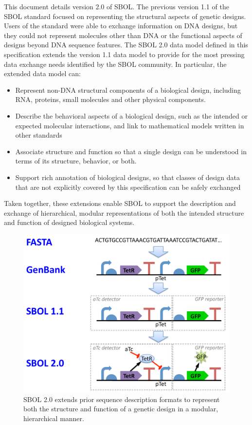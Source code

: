 This document details version 2.0 of SBOL.
The previous version 1.1 of the SBOL standard focused on representing the structural aspects of genetic designs. Users of the standard were able to exchange information on DNA designs, but they could not represent molecules other than DNA or the functional aspects of designs beyond DNA sequence features. The SBOL 2.0 data model defined in this specification extends the version 1.1 data model to provide for the most pressing data exchange needs identified by the SBOL community. In particular, the extended data model can:
\begin{itemize}

\item Represent non-DNA structural components of a biological design, including RNA, proteins, small molecules and other physical components.

\item Describe the behavioral aspects of a biological design, such as the intended or expected molecular interactions, and link to mathematical models written in other standards

\item Associate structure and function so that a single design can be understood in terms of its structure, behavior, or both.

\item Support rich annotation of biological designs, so that classes of design data that are not explicitly covered by this specification can be safely exchanged

\end{itemize}
Taken together, these extensions enable SBOL to support the description and exchange of hierarchical, modular representations of both the intended structure and function of designed biological systems.

\begin{figure}
\centering
\includegraphics[width=5in]{images/format-comparison.pdf}
\caption{SBOL 2.0 extends prior sequence description formats to represent both the structure and function of a genetic design in a modular, hierarchical manner.}
\label{f:sequence}
\end{figure}

